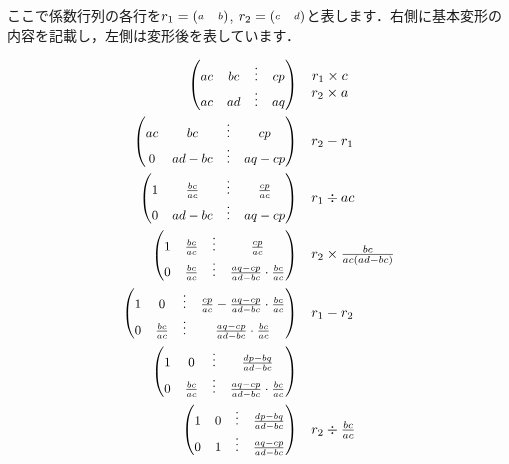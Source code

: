 \documentclass[../main]{subfiles}
\begin{document}
\begin{code}[language=tex]
ここで係数行列の各行を$r_1 = {\scriptsize\begin{pmatrix}a&b\end{pmatrix}}$, $r_2 = {\scriptsize\begin{pmatrix}c&d\end{pmatrix}}$と表します．右側に基本変形の内容を記載し，左側は変形後を表しています．

\begin{align*}
    {\small\begin{pmatrix}{}ac&bc&\vdots&cp\\ac&ad&\vdots&aq\end{pmatrix}} &
    \quad \begin{matrix}
        r_1\times c\\r_2\times a
    \end{matrix} \\
    {\small\begin{pmatrix}{}ac&bc&\vdots&cp\\0&ad-bc&\vdots&aq-cp\end{pmatrix}} &
    \quad \begin{matrix}
        r_2-r_1
    \end{matrix} \\
    {\small\begin{pmatrix}{}1&\frac{bc}{ac}&\vdots&\frac{cp}{ac}\\0&ad-bc&\vdots&aq-cp\end{pmatrix}} &
    \quad \begin{matrix}
        r_1\div ac
    \end{matrix} \\
    {\small\begin{pmatrix}{}1&\frac{bc}{ac}&\vdots&\frac{cp}{ac}\\0&\frac{bc}{ac}&\vdots&\frac{aq-cp}{ad-bc}\cdot\frac{bc}{ac}\end{pmatrix}} &
    \quad \begin{matrix}
        r_2\times \frac{bc}{ac(ad-bc)}
    \end{matrix} \\
    {\small\begin{pmatrix}{}1&0&\vdots&\frac{cp}{ac}-\frac{aq-cp}{ad-bc}\cdot\frac{bc}{ac}\\0&\frac{bc}{ac}&\vdots&\frac{aq-cp}{ad-bc}\cdot\frac{bc}{ac}\end{pmatrix}} &
    \quad \begin{matrix}
        r_1-r_2
    \end{matrix} \\
    {\small\begin{pmatrix}{}1&0&\vdots&\frac{dp-bq}{ad-bc}\\0&\frac{bc}{ac}&\vdots&\frac{aq-cp}{ad-bc}\cdot\frac{bc}{ac}\end{pmatrix}} &
    \quad \begin{matrix}
    \end{matrix} \\
    {\small\begin{pmatrix}{}1&0&\vdots&\frac{dp-bq}{ad-bc}\\0&1&\vdots&\frac{aq-cp}{ad-bc}\end{pmatrix}} &
    \quad \begin{matrix}
        r_2\div \frac{bc}{ac}
    \end{matrix}
\end{align*}
\end{code}
\end{document}
